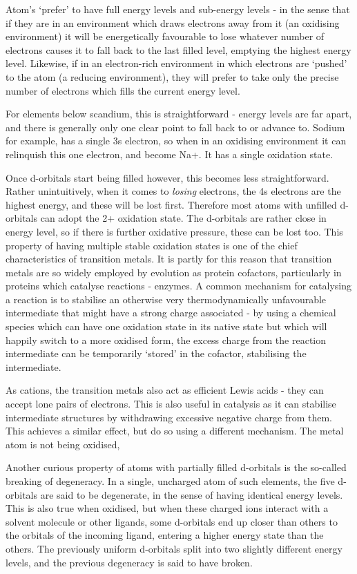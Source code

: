 Atom's `prefer' to have full energy levels and sub-energy levels - in the sense that if they are in an environment which draws electrons away from it (an oxidising environment) it will be energetically favourable to lose whatever number of electrons causes it to fall back to the last filled level, emptying the highest energy level. Likewise, if in an electron-rich environment in which electrons are `pushed' to the atom (a reducing environment), they will prefer to take only the precise number of electrons which fills the current energy level.

For elements below scandium, this is straightforward - energy levels are far apart, and there is generally only one clear point to fall back to or advance to. Sodium for example, has a single 3s electron, so when in an oxidising environment it can relinquish this one electron, and become Na+. It has a single oxidation state.

Once d-orbitals start being filled however, this becomes less straightforward. Rather unintuitively, when it comes to \emph{losing} electrons, the 4s electrons are the highest energy, and these will be lost first. Therefore most atoms with unfilled d-orbitals can adopt the 2+ oxidation state. The d-orbitals are rather close in energy level, so if there is further oxidative pressure, these can be lost too. This property of having multiple stable oxidation states is one of the chief characteristics of transition metals. It is partly for this reason that transition metals are so widely employed by evolution as protein cofactors, particularly in proteins which catalyse reactions - enzymes. A common mechanism for catalysing a reaction is to stabilise an otherwise very thermodynamically unfavourable intermediate that might have a strong charge associated - by using a chemical species which can have one oxidation state in its native state but which will happily switch to a more oxidised form, the excess charge from the reaction intermediate can be temporarily `stored' in the cofactor, stabilising the intermediate.

As cations, the transition metals also act as efficient Lewis acids - they can accept lone pairs of electrons. This is also useful in catalysis as it can stabilise intermediate structures by withdrawing excessive negative charge from them. This achieves a similar effect, but do so using a different mechanism. The metal atom is not being oxidised, 

Another curious property of atoms with partially filled d-orbitals is the so-called breaking of degeneracy. In a single, uncharged atom of such elements, the five d-orbitals are said to be degenerate, in the sense of having identical energy levels. This is also true when oxidised, but when these charged ions interact with a solvent molecule or other ligands, some d-orbitals end up closer than others to the orbitals of the incoming ligand, entering a higher energy state than the others. The previously uniform d-orbitals split into two slightly different energy levels, and the previous degeneracy is said to have broken.


